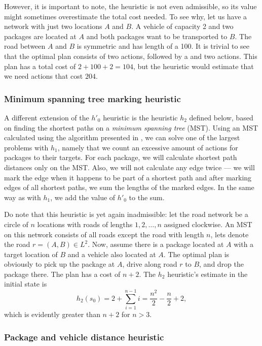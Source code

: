 However, it is important to note, the heuristic
is not even admissible, so its value might sometimes overestimate the total cost needed.
To see why, let us have a network with just two locations $A$ and $B$.
A vehicle of capacity 2 and two packages are located at $A$ and both packages want to be
transported to $B$. The road between $A$ and $B$ is symmetric and has length
of a 100. It is trivial to see that the optimal plan consists of two \pickup{} actions,
followed by a \drive{} and two \drop{} actions. This plan has a total cost of $2+100+2=104$,
but the heuristic would estimate that we need actions
that cost $204$.

\subsubsection{Minimum spanning tree marking heuristic}\label{sfa2}

A different extension of the $h'_0$ heuristic
is the heuristic $h_2$ defined below, based
on finding the shortest paths on a \textit{minimum spanning tree} (MST).
Using an MST calculated using the algorithm presented in \citet{Kruskal1956}, we can solve one of the largest problems with $h_1$,
namely that we count an excessive amount of \drive{} actions
for packages to their targets.
For each package, we will calculate
shortest path distances only on the MST.
Also, we will not calculate any edge twice --- we will mark
the edge when it happens to be part of a shortest path and
after marking edges of all shortest paths,
we sum the lengths of the marked edges.
In the same way as with $h_1$, we add the value of $h'_0$ to
the sum.

Do note that this heuristic is yet again inadmissible:
let the road network be a circle of $n$ locations with
roads of lengths $1, 2, \ldots, n$ assigned clockwise.
An MST on this network consists of all roads except the road
with length $n$, lets denote the road $r = (A, B) \in L^2$.
Now, assume there is a package located at $A$ with a target
location of $B$ and a vehicle also located at $A$.
The optimal plan is obviously to pick up the package at $A$,
drive along road $r$ to $B$, and drop the package there.
The plan has a cost of $n+2$. The $h_2$ heuristic's estimate
in the initial state is $$h_2(s_0) = 2 + \sum_{i=1}^{n-1} i = \frac{n^2}{2} - \frac{n}{2} + 2,$$
which is evidently greater than $n+2$ for $n > 3$.

\subsubsection{Package and vehicle distance heuristic}\label{sfa3}

